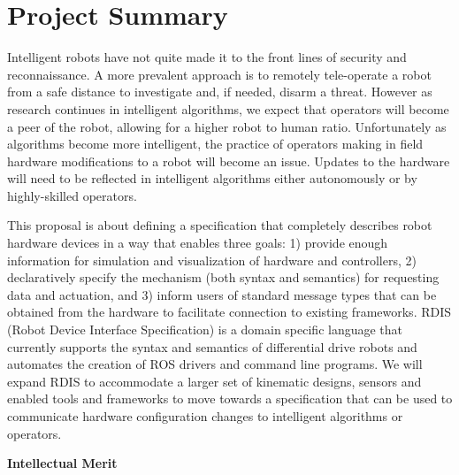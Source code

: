 
\section*{\vspace{-2em}\center Project Summary}

Intelligent robots have not quite made it to the front lines of security and reconnaissance.  A more prevalent approach is to remotely tele-operate a robot from a safe distance to investigate and, if needed, disarm a threat.  However as research continues in intelligent algorithms, we expect that operators will become a peer of the robot, allowing for a higher robot to human ratio.  Unfortunately as algorithms become more intelligent, the practice of operators making in field hardware modifications to a robot will become an issue.  Updates to the hardware will need to be reflected in intelligent algorithms either autonomously or by highly-skilled operators.  

This proposal is about defining a specification that completely describes robot hardware devices in a way that enables three goals: 1) provide enough information for simulation and visualization of hardware and controllers, 2) declaratively specify the mechanism (both syntax and semantics) for requesting data and actuation, and 3) inform users of standard message types that can be obtained from the hardware to facilitate connection to existing frameworks.  RDIS (Robot Device Interface Specification) is a domain specific language that currently supports the syntax and semantics of differential drive robots and automates the creation of ROS drivers and command line programs.  We will expand RDIS to accommodate a larger set of kinematic designs, sensors and enabled tools and frameworks to move towards a specification that can be used to communicate hardware configuration changes to intelligent algorithms or operators. 

%
%  

\textbf{Intellectual Merit}

